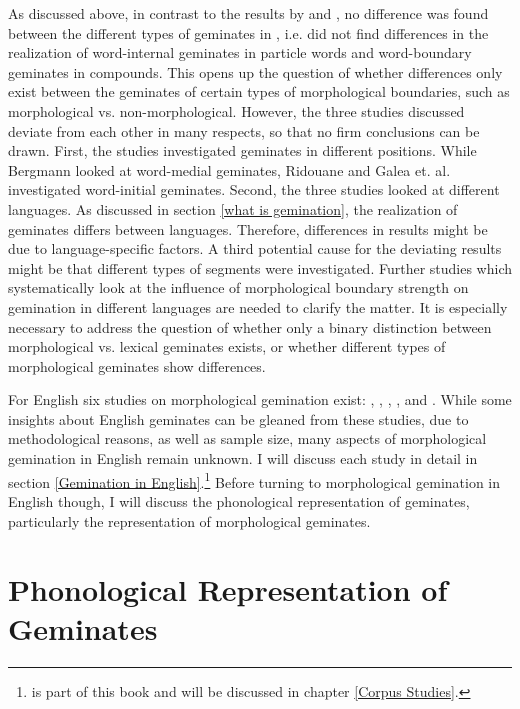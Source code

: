 As discussed above, in contrast to the results by \cite{Ridouane.2010} and \cite{Galea.2014}, no difference was found between the different types of geminates in \cite{Bergmann.2017}, i.e. \cite{Bergmann.2017} did not find differences in the realization of word-internal geminates in particle words and word-boundary geminates in compounds. This opens up the question of whether differences only exist between the geminates of certain types of morphological boundaries, such as morphological vs. non-morphological. However, the three studies discussed deviate from each other in many respects, so that no firm conclusions can be drawn. First, the studies investigated geminates in different positions. While Bergmann looked at word-medial geminates, Ridouane and Galea et. al. investigated word-initial geminates. Second, the three studies looked at different languages. As discussed in section \ref{what is gemination}, the realization of geminates differs between languages. Therefore, differences in results might be due to language-specific factors. A third potential cause for the deviating results might be that different types of segments were investigated. Further studies which systematically look at the influence of morphological boundary strength on gemination in different languages are needed to clarify the matter. It is especially necessary to address the question of whether only a binary distinction between morphological vs. lexical geminates exists, or whether different types of morphological geminates show differences.


For English six studies on morphological gemination exist: \cite{Delattre.}, \citet{Kaye.2005}, \citet{Oh.2012}, \cite{Oh.2013}, \cite{Kotzor.2016} and \cite{BenHedia.2017}. While some insights about English geminates can be gleaned from these studies, due to methodological reasons, as well as sample size, many aspects of morphological gemination in English remain unknown. I will discuss each study in detail in section \ref{Gemination in English}.\footnote{\cite{BenHedia.2017} is part of this book and will be discussed in chapter \ref{Corpus Studies}.} Before turning to morphological gemination in English though, I will discuss the phonological representation of geminates, particularly the representation of morphological geminates.



\section{Phonological Representation of Geminates } \label{Phonological representation of geminates}

